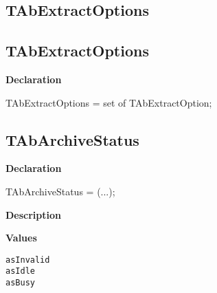 \documentclass{report}
\newif\ifpdf
\begin{document}
\subsection*{\large{\textbf{TAbExtractOptions}}\normalsize\hspace{1ex}\hrulefill}
\else
\subsection*{TAbExtractOptions}
\fi
\label{AbArcTyp-TAbExtractOptions}
\begin{list}{}{
\setlength{\itemindent}{0cm}
\setlength{\listparindent}{0cm}
\setlength{\leftmargin}{\evensidemargin}
\addtolength{\leftmargin}{\tmplength}
\settowidth{\labelsep}{X}
\addtolength{\leftmargin}{\labelsep}
\setlength{\labelwidth}{\tmplength}
}
\item[\textbf{Declaration}\hfill]
\ifpdf
\begin{flushleft}
\fi
\begin{ttfamily}
TAbExtractOptions =
    set of TAbExtractOption;\end{ttfamily}

\ifpdf
\end{flushleft}
\fi

\end{list}
\ifpdf
\subsection*{\large{\textbf{TAbArchiveStatus}}\normalsize\hspace{1ex}\hrulefill}
\else
\subsection*{TAbArchiveStatus}
\fi
\label{AbArcTyp-TAbArchiveStatus}
\begin{list}{}{
\setlength{\itemindent}{0cm}
\setlength{\listparindent}{0cm}
\setlength{\leftmargin}{\evensidemargin}
\addtolength{\leftmargin}{\tmplength}
\settowidth{\labelsep}{X}
\addtolength{\leftmargin}{\labelsep}
\setlength{\labelwidth}{\tmplength}
}
\item[\textbf{Declaration}\hfill]
\ifpdf
\begin{flushleft}
\fi
\begin{ttfamily}
TAbArchiveStatus = (...);\end{ttfamily}

\ifpdf
\end{flushleft}
\fi

\par
\item[\textbf{Description}]
 \item[\textbf{Values}]
\begin{description}
\item[\texttt{asInvalid}]  
\item[\texttt{asIdle}]  
\item[\texttt{asBusy}]  
\end{description}


\end{list}
\ifpdf
\end{document}
